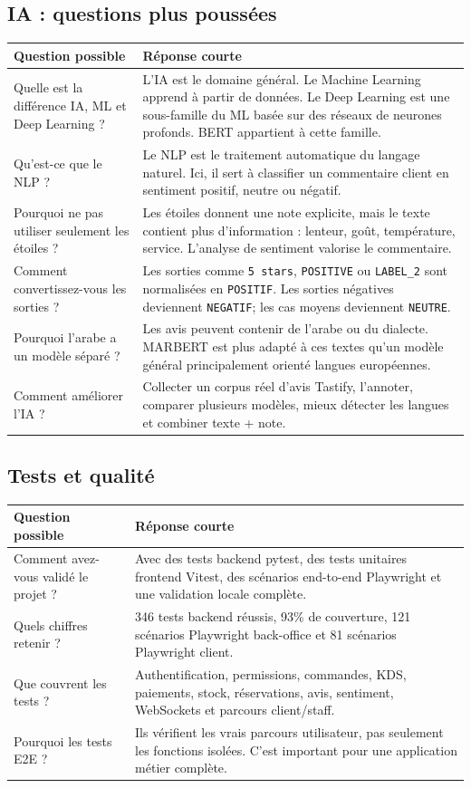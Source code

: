 \documentclass[10pt,a4paper]{article}
\newcommand{\code}[1]{\texttt{#1}}
\begin{document}
\subsection{IA : questions plus poussées}

\begin{tabularx}{\textwidth}{p{5cm}Y}
\toprule
\textbf{Question possible} & \textbf{Réponse courte} \\
\midrule
Quelle est la différence IA, ML et Deep Learning ? & L'IA est le domaine général. Le Machine Learning apprend à partir de données. Le Deep Learning est une sous-famille du ML basée sur des réseaux de neurones profonds. BERT appartient à cette famille. \\
Qu'est-ce que le NLP ? & Le NLP est le traitement automatique du langage naturel. Ici, il sert à classifier un commentaire client en sentiment positif, neutre ou négatif. \\
Pourquoi ne pas utiliser seulement les étoiles ? & Les étoiles donnent une note explicite, mais le texte contient plus d'information : lenteur, goût, température, service. L'analyse de sentiment valorise le commentaire. \\
Comment convertissez-vous les sorties ? & Les sorties comme \code{5 stars}, \code{POSITIVE} ou \code{LABEL\_2} sont normalisées en \code{POSITIF}. Les sorties négatives deviennent \code{NEGATIF}; les cas moyens deviennent \code{NEUTRE}. \\
Pourquoi l'arabe a un modèle séparé ? & Les avis peuvent contenir de l'arabe ou du dialecte. MARBERT est plus adapté à ces textes qu'un modèle général principalement orienté langues européennes. \\
Comment améliorer l'IA ? & Collecter un corpus réel d'avis Tastify, l'annoter, comparer plusieurs modèles, mieux détecter les langues et combiner texte + note. \\
\bottomrule
\end{tabularx}

\subsection{Tests et qualité}

\begin{tabularx}{\textwidth}{p{5cm}Y}
\toprule
\textbf{Question possible} & \textbf{Réponse courte} \\
\midrule
Comment avez-vous validé le projet ? & Avec des tests backend pytest, des tests unitaires frontend Vitest, des scénarios end-to-end Playwright et une validation locale complète. \\
Quels chiffres retenir ? & 346 tests backend réussis, 93\% de couverture, 121 scénarios Playwright back-office et 81 scénarios Playwright client. \\
Que couvrent les tests ? & Authentification, permissions, commandes, KDS, paiements, stock, réservations, avis, sentiment, WebSockets et parcours client/staff. \\
Pourquoi les tests E2E ? & Ils vérifient les vrais parcours utilisateur, pas seulement les fonctions isolées. C'est important pour une application métier complète. \\
\bottomrule
\end{tabularx}
\end{document}
